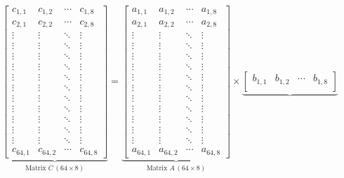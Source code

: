 \documentclass[12pt]{article}
\begin{document}
$$
\underbrace{
\begin{bmatrix}
c_{1,1} & c_{1,2} & \cdots & c_{1,8} \\
c_{2,1} & c_{2,2} & \cdots & c_{2,8} \\
\vdots  & \vdots  & \ddots & \vdots  \\
\vdots  & \vdots  & \ddots & \vdots  \\
\vdots  & \vdots  & \ddots & \vdots  \\
\vdots  & \vdots  & \ddots & \vdots  \\
\vdots  & \vdots  & \ddots & \vdots  \\
\vdots  & \vdots  & \ddots & \vdots  \\
\vdots  & \vdots  & \ddots & \vdots  \\
\vdots  & \vdots  & \ddots & \vdots  \\
\vdots  & \vdots  & \ddots & \vdots  \\
\vdots  & \vdots  & \ddots & \vdots  \\
\vdots  & \vdots  & \ddots & \vdots  \\
c_{64,1}& c_{64,2}& \cdots & c_{64,8}
\end{bmatrix}
}_{\text{Matrix } C \, (64 \times 8)}
=
\underbrace{
\begin{bmatrix}
a_{1,1} & a_{1,2} & \cdots & a_{1,8} \\
a_{2,1} & a_{2,2} & \cdots & a_{2,8} \\
\vdots  & \vdots  & \ddots & \vdots  \\
\vdots  & \vdots  & \ddots & \vdots  \\
\vdots  & \vdots  & \ddots & \vdots  \\
\vdots  & \vdots  & \ddots & \vdots  \\
\vdots  & \vdots  & \ddots & \vdots  \\
\vdots  & \vdots  & \ddots & \vdots  \\
\vdots  & \vdots  & \ddots & \vdots  \\
\vdots  & \vdots  & \ddots & \vdots  \\
\vdots  & \vdots  & \ddots & \vdots  \\
\vdots  & \vdots  & \ddots & \vdots  \\
\vdots  & \vdots  & \ddots & \vdots  \\
a_{64,1}& a_{64,2}& \cdots & a_{64,8}
\end{bmatrix}
}_{\text{Matrix } A \, (64 \times 8)}
\times
\underbrace{
\begin{bmatrix}
b_{1,1} & b_{1,2} & \cdots & b_{1,8} \\

\end{bmatrix}}$$
\end{document}
